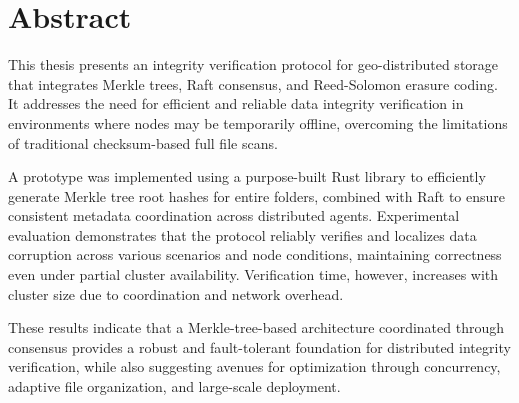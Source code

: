 \shipout\null
\chapter*{Abstract}
\thispagestyle{empty}

This thesis presents an integrity verification protocol for geo-distributed storage that integrates Merkle trees, Raft consensus, and Reed-Solomon erasure coding.
It addresses the need for efficient and reliable data integrity verification in environments where nodes may be temporarily offline, overcoming the limitations of traditional checksum-based full file scans.

A prototype was implemented using a purpose-built Rust library to efficiently generate Merkle tree root hashes for entire folders, combined with Raft to ensure consistent metadata coordination across distributed agents.
Experimental evaluation demonstrates that the protocol reliably verifies and localizes data corruption across various scenarios and node conditions, maintaining correctness even under partial cluster availability.
Verification time, however, increases with cluster size due to coordination and network overhead.

These results indicate that a Merkle-tree-based architecture coordinated through consensus provides a robust and fault-tolerant foundation for distributed integrity verification, while also suggesting avenues for optimization through concurrency, adaptive file organization, and large-scale deployment.

